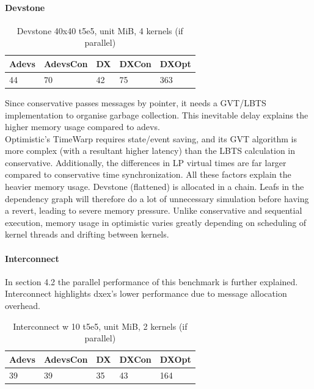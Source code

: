 \paragraph*{Devstone}
\begin{table}[lhtb]
	\centering
	\caption{Devstone 40x40 t5e5, unit MiB, 4 kernels (if parallel)}
	\label{dtone_mem}
	\begin{tabular}{| l | l | l | l | l |}
		\hline
		Adevs & AdevsCon &DX &DXCon &DXOpt\\ \hline
		44 & 70 & 42 & 75 & 363  \\ \hline
	\end{tabular}
\end{table}
Since conservative passes messages by pointer, it needs a GVT/LBTS implementation to organise garbage collection. This inevitable delay explains the higher memory usage compared to adevs.\\
Optimistic's TimeWarp requires state/event saving, and its GVT algorithm is more complex (with a resultant higher latency) than the LBTS calculation in conservative. 
Additionally, the differences in LP virtual times are far larger compared to conservative time synchronization. All these factors explain the heavier memory usage. Devstone (flattened) is allocated in a chain. Leafs in the dependency graph will therefore do a lot of unnecessary simulation before having a revert, leading to severe memory pressure. Unlike conservative and sequential execution, memory usage in optimistic varies greatly depending on scheduling of kernel threads and drifting between kernels. 
\paragraph*{Interconnect}
In section 4.2 the parallel performance of this benchmark is further explained. Interconnect highlights dxex's lower performance due to message allocation overhead.
\begin{table}[lhtb]
	\centering
	\caption{Interconnect w 10 t5e5, unit MiB, 2 kernels (if parallel)}
	\label{iconn_mem}
	\begin{tabular}{| l | l | l | l | l |}
		\hline
		Adevs & AdevsCon &DX &DXCon & DXOpt\\ \hline
		39 & 39 & 35 & 43 & 164 \\ \hline
	\end{tabular}
\end{table}
		
